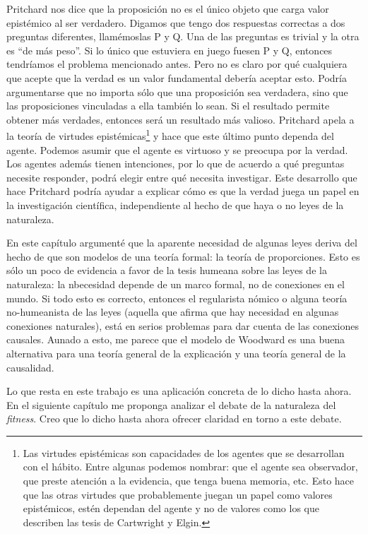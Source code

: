 Pritchard nos dice que la proposición no es el único objeto que carga valor epistémico al ser verdadero. Digamos que tengo dos respuestas correctas a dos preguntas diferentes, llamémoslas P y Q. Una de las preguntas es trivial y la otra es ``de más peso''. Si lo único que estuviera en juego fuesen P y Q, entonces tendríamos el problema mencionado antes. Pero no es claro por qué cualquiera que acepte que la verdad es un valor fundamental debería aceptar esto. Podría argumentarse que no importa sólo que una proposición sea verdadera, sino que las proposiciones vinculadas a ella también lo sean. Si el resultado permite obtener más verdades, entonces será un resultado más valioso. Pritchard apela a la teoría de virtudes epistémicas\footnote{Las virtudes epistémicas son capacidades de los agentes que se desarrollan con el hábito. Entre algunas podemos nombrar: que el agente sea observador, que preste atención a la evidencia, que tenga buena memoria, etc. Esto hace que las otras virtudes que probablemente juegan un papel como valores epistémicos, estén dependan del agente y no de valores como los que describen las tesis de Cartwright y Elgin.} y hace que este último punto dependa del agente. Podemos asumir que el agente es virtuoso y se preocupa por la verdad. Los agentes además tienen intenciones, por lo que de acuerdo a qué preguntas necesite responder, podrá elegir entre qué necesita investigar. Este desarrollo que hace Pritchard podría ayudar a explicar cómo es que la verdad juega un papel en la investigación científica, independiente al hecho de que haya o no leyes de la naturaleza.

En este capítulo argumenté que la aparente necesidad de algunas leyes deriva del hecho de que son modelos de una teoría formal: la teoría de proporciones. Esto es sólo un poco de evidencia a favor de la tesis humeana sobre las leyes de la naturaleza: la nbecesidad depende de un marco formal, no de conexiones en el mundo. Si todo esto es correcto, entonces el regularista nómico o alguna teoría no-humeanista de las leyes (aquella que afirma que hay necesidad en algunas conexiones naturales), está en serios problemas para dar cuenta de las conexiones causales. Aunado a esto, me parece que el modelo de Woodward es una buena alternativa para una teoría general de la explicación y una teoría general de la causalidad.

Lo que resta en este trabajo es una aplicación concreta de lo dicho hasta ahora. En el siguiente capítulo me proponga analizar el debate de la naturaleza del \emph{fitness}. Creo que lo dicho hasta ahora ofrecer claridad en torno a este debate.

